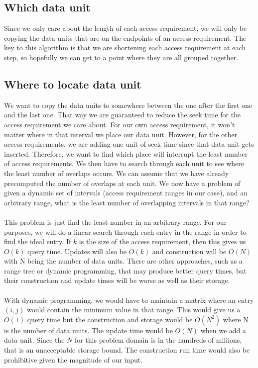 \documentclass[11pt,psfig]{article}
\begin{document}
\subsection*{Which data unit}

Since we only care about the length of each access requirement, we will only be copying the data units that are on the endpoints of an access requirement. The key to this algorithm is that we are shortening each access requirement at each step, so hopefully we can get to a point where they are all grouped together. 

\subsection*{Where to locate data unit}

We want to copy the data units to somewhere between the one after the first one and the last one. That way we are guaranteed to reduce the seek time for the access requirement we care about. For our own access requirement, it won't matter where in that interval we place our data unit. However, for the other access requirements, we are adding one unit of seek time since that data unit gets inserted. Therefore, we want to find which place will interrupt the least number of access requirements. We then have to search through each unit to see where the least number of overlaps occurs. We can assume that we have already precomputed the number of overlaps at each unit. We now have a problem of given a dynamic set of intervals (access requirement ranges in our case), and an arbitrary range, what is the least number of overlapping intervals in that range?\\
\\
This problem is just find the least number in an arbitrary range. For our purposes, we will do a linear search through each entry in the range in order to find the ideal entry. If $k$ is the size of the access requirement, then this gives us $O(k)$ query time. Updates will also be $O(k)$ and construction will be $O(N)$ with N being the number of data units. There are other approaches, such as a range tree or dynamic programming, that may produce better query times, but their construction and update times will be worse as well as their storage. \\
\\
With dynamic programming, we would have to maintain a matrix where an entry $(i,j)$ would contain the minimum value in that range. This would give us a $O(1)$ query time but the construction and storage would be $O(N^2)$ where N is the number of data units. The update time would be $O(N)$ when we add a data unit. Since the $N$ for this problem domain is in the hundreds of millions, that is an unacceptable storage bound. The construction run time would also be prohibitive given the magnitude of our input. \\
\end{document}
